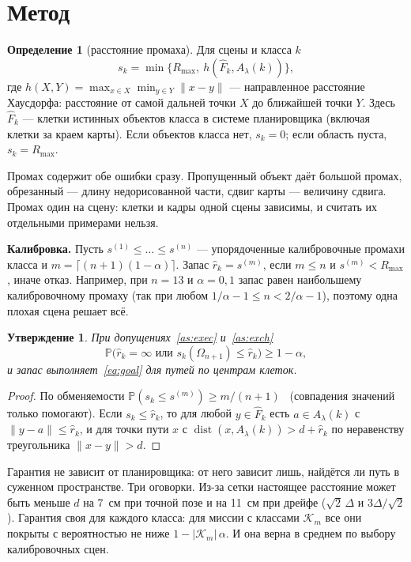 \documentclass[conference,a4paper]{IEEEtran}
\newtheorem{proposition}{Утверждение}
\theoremstyle{definition}
\newtheorem{definition}{Определение}
\begin{document}
\section{Метод}\label{sec:method}

\begin{definition}[расстояние промаха]
Для сцены и класса $k$
\begin{equation}
  s_k = \min\bigl\{R_{\max},\ h(\hat F_k, A_\lambda(k))\bigr\},
  \label{eq:miss}
\end{equation}
где $h(X, Y) = \max_{x\in X} \min_{y\in Y} \|x - y\|$ --- направленное расстояние Хаусдорфа: расстояние от самой
дальней точки $X$ до ближайшей точки $Y$. Здесь $\hat F_k$ --- клетки истинных объектов класса в системе планировщика
(включая клетки за краем карты). Если объектов класса нет, $s_k = 0$; если область пуста, $s_k = R_{\max}$.
\end{definition}

Промах содержит обе ошибки сразу. Пропущенный объект даёт большой промах, обрезанный --- длину недорисованной части,
сдвиг карты --- величину сдвига. Промах один на сцену: клетки и кадры одной сцены зависимы, и считать их отдельными
примерами нельзя.

\textbf{Калибровка.} Пусть $s^{(1)} \le \dots \le s^{(n)}$ --- упорядоченные калибровочные промахи класса и
$m = \lceil (n+1)(1-\alpha) \rceil$. Запас $\hat r_k = s^{(m)}$, если $m \le n$ и $s^{(m)} < R_{\max}$, иначе отказ.
Например, при $n = 13$ и $\alpha = 0{,}1$ запас равен наибольшему калибровочному промаху (так при любом
$1/\alpha - 1 \le n < 2/\alpha - 1$), поэтому одна плохая сцена решает всё.

\begin{proposition}\label{prop:valid}
При допущениях~\ref{as:exec} и~\ref{as:exch}
\[
  \mathbb P\bigl(\hat r_k = \infty \text{ или } s_k(\Omega_{n+1}) \le \hat r_k\bigr) \ge 1 - \alpha,
\]
и запас выполняет~\eqref{eq:goal} для путей по центрам клеток.
\end{proposition}
\begin{proof}
По обменяемости $\mathbb P(s_k \le s^{(m)}) \ge m/(n+1)$~\cite{gentle} (совпадения значений только помогают). Если
$s_k \le \hat r_k$, то для любой $y \in \hat F_k$ есть $a \in A_\lambda(k)$ с $\|y - a\| \le \hat r_k$, и для точки
пути $x$ с $\operatorname{dist}(x, A_\lambda(k)) > d + \hat r_k$ по неравенству треугольника $\|x - y\| > d$.
\end{proof}

Гарантия не зависит от планировщика: от него зависит лишь, найдётся ли путь в суженном пространстве. Три оговорки.
Из-за сетки настоящее расстояние может быть меньше $d$ на 7~см при точной позе и на 11~см при дрейфе
($\sqrt 2\,\Delta$ и $3\Delta/\sqrt 2$). Гарантия своя для каждого класса: для миссии с классами $\mathcal K_m$ все
они покрыты с вероятностью не ниже $1 - |\mathcal K_m|\,\alpha$. И она верна в среднем по выбору калибровочных сцен.
\end{document}
